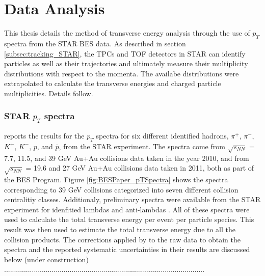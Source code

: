 \chapter{Data Analysis} \label{ch:analysis}
This thesis details the method of transverse energy analysis through the use of $p_{T}$ spectra from the STAR BES data. As described in section \ref{subsec:tracking_STAR}, the TPCs and TOF detectors in STAR can identify particles as well as their trajectories and ultimately measure their multiplicity distributions with respect to the momenta. The availabe distributions were extrapolated to calculate the transverse energies and charged particle multiplicities. Details follow.

\subsection{STAR $p_{T}$ spectra}
\citet{PhysRevC.96.044904} reports the results for the $p_{T}$ spectra for six different identified hadrons, $\pi^+$, $\pi^-$, $K^+$, $K^-$, $p$, and $\bar{p}$, from the STAR experiment. The spectra come from $\sqrt{s_{NN}}$ = 7.7, 11.5, and 39 GeV Au+Au collisions data taken in the year 2010, and from $\sqrt{s_{NN}}$ = 19.6 and 27 GeV Au+Au collisions data taken in 2011, both as part of the BES Program. Figure \ref{fig:BESPaper_pTSpectra} \cite{PhysRevC.96.044904} shows the spectra corresponding to 39 GeV collisions categorized into seven different collision centralitiy classes. Additionaly, preliminary spectra were available from the STAR experiment for idenfitied lambdas and anti-lambdas \cite{private communication with... }. All of these spectra were used to calculate the total transverse energy per event per particle species. This result was then used to estimate the total transverse energy due to all the collision products. The corrections applied by \citet{PhysRevC.96.044904} to the raw data to obtain the spectra and the reported systematic uncertainties in their results are discussed below (under construction) .....................................................................................................
